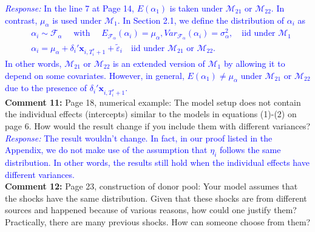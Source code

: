 \documentclass[12pt]{article}
\newcommand{\response}[1]{\noindent \textcolor{blue}{\emph{Response:} #1}}
\begin{document}
\response{In the line 7 at Page 14, $E(\alpha_1)$ is taken under $\mathcal{M}_{21}$ or $\mathcal{M}_{22}$. In contrast, $\mu_{\alpha}$ is used under $\mathcal{M}_{1}$. In Section 2.1, we define the distribution of $\alpha_i$ as
\begin{align*}
  &\alpha_i \sim \mathcal{F}_{\alpha} 
 \quad  \text{ with }\quad  E_{\mathcal{F}_{\alpha}}(\alpha_i) =\mu_{\alpha}, Var_{\mathcal{F}_{\alpha}}(\alpha_i)=\sigma^2_{\alpha},\quad   \text{iid under } \mathcal{M}_1\\
 & \alpha_i = \mu_{\alpha} +\delta_i'\mathbf{x}_{i, T_i^*+1} + \tilde{\varepsilon}_i\quad  \text{iid under } \mathcal{M}_{21} \text{ or } \mathcal{M}_{22}.
\end{align*}
In other words,  $\mathcal{M}_{21}$  or $\mathcal{M}_{22}$ is an extended version of $\mathcal{M}_{1}$ by allowing it to depend on some covariates. However, in general, $E(\alpha_1)\neq \mu_{\alpha}$ under   $\mathcal{M}_{21}$  or $\mathcal{M}_{22}$ due to the presence of $\delta_i'\mathbf{x}_{i, T_i^*+1}$.} \\

{\bf Comment 11:} Page 18, numerical example: The model setup does not contain the individual effects (intercepts) similar to the models in equations (1)-(2) on page 6. How would the result change if you include them with different variances? \\

\response{The result wouldn't change. In fact, in our proof listed in the Appendix, we do not make use of the assumption that $\eta_i$ follows the same distribution. In other words, the results  still hold when the individual effects have different variances.}\\


{\bf Comment 12:} Page 23, construction of donor pool: Your model assumes that the shocks have the same distribution. Given that these shocks are from different sources and happened because of various reasons, how could one justify them? Practically, there are many previous shocks. How can someone choose from them?\\
\end{document}

